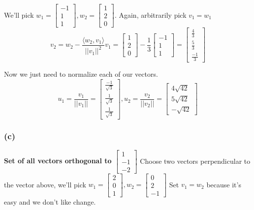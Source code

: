 \documentclass[10pt,letterpaper]{article}
\begin{document}
	We'll pick $w_1 = \begin{bmatrix}
	-1 \\ 1 \\ 1
	\end{bmatrix}, w_2 = \begin{bmatrix}
	1 \\ 2 \\0 
	\end{bmatrix}$.  Again, arbitrarily pick $v_1 = w_1$
	$$
	v_2 = w_2 - \frac{\langle w_2, v_1 \rangle}{||v_1||^2} v_1 = \begin{bmatrix}
	1 \\ 2 \\ 0
	\end{bmatrix} - \frac{1}{3} \begin{bmatrix}
	-1 \\ 1 \\ 1
	\end{bmatrix} = \begin{bmatrix}
	\frac{4}{3} \\ \frac{5}{3} \\ \frac{-1}{3}
	\end{bmatrix}
	$$
	
	Now we just need to normalize each of our vectors.
	$$
	\boxed{u_1 = \frac{v_1}{||v_1||} = \begin{bmatrix}
		\frac{-1}{\sqrt{3}} \\ \frac{1}{\sqrt{3}} \\ \frac{1}{\sqrt{3}}
		\end{bmatrix}, u_2 = \frac{v_2}{||v_2||} = \begin{bmatrix}
		4 \sqrt{42} \\ 5 \sqrt{42} \\ -\sqrt{42}
		\end{bmatrix}}
	$$
	\subsubsection*{(c)} \textbf{Set of all vectors orthogonal to $\begin{bmatrix}
			1 \\ -1 \\ -2
		\end{bmatrix}$}
	Choose two vectors perpendicular to the vector above, we'll pick $w_1 = \begin{bmatrix}
	2 \\ 0 \\ 1
	\end{bmatrix}, w_2  =\begin{bmatrix}
	0 \\ 2 \\ -1
	\end{bmatrix}$ Set $v_1 = w_2$ because it's easy and we don't like change. 
	
\end{document}
